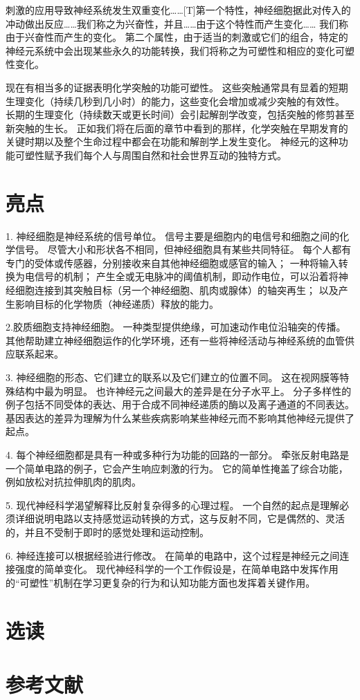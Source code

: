 刺激的应用导致神经系统发生双重变化……[T]第一个特性，神经细胞据此对传入的冲动做出反应……我们称之为兴奋性，并且……由于这个特性而产生变化…… 我们称由于兴奋性而产生的变化。 
第二个属性，由于适当的刺激或它们的组合，特定的神经元系统中会出现某些永久的功能转换，我们将称之为可塑性和相应的变化可塑性变化。


现在有相当多的证据表明化学突触的功能可塑性。 
这些突触通常具有显着的短期生理变化（持续几秒到几小时）的能力，这些变化会增加或减少突触的有效性。 
长期的生理变化（持续数天或更长时间）会引起解剖学改变，包括突触的修剪甚至新突触的生长。 
正如我们将在后面的章节中看到的那样，化学突触在早期发育的关键时期以及整个生命过程中都会在功能和解剖学上发生变化。 
神经元的这种功能可塑性赋予我们每个人与周围自然和社会世界互动的独特方式。



\section{亮点}
1. 神经细胞是神经系统的信号单位。 信号主要是细胞内的电信号和细胞之间的化学信号。 
尽管大小和形状各不相同，但神经细胞具有某些共同特征。 
每个人都有专门的受体或传感器，分别接收来自其他神经细胞或感官的输入； 
一种将输入转换为电信号的机制； 产生全或无电脉冲的阈值机制，即动作电位，可以沿着将神经细胞连接到其突触目标（另一个神经细胞、肌肉或腺体）的轴突再生； 以及产生影响目标的化学物质（神经递质）释放的能力。


2.胶质细胞支持神经细胞。 
一种类型提供绝缘，可加速动作电位沿轴突的传播。 
其他帮助建立神经细胞运作的化学环境，还有一些将神经活动与神经系统的血管供应联系起来。


3. 神经细胞的形态、它们建立的联系以及它们建立的位置不同。 
这在视网膜等特殊结构中最为明显。 
也许神经元之间最大的差异是在分子水平上。 
分子多样性的例子包括不同受体的表达、用于合成不同神经递质的酶以及离子通道的不同表达。 
基因表达的差异为理解为什么某些疾病影响某些神经元而不影响其他神经元提供了起点。


4. 每个神经细胞都是具有一种或多种行为功能的回路的一部分。 
牵张反射电路是一个简单电路的例子，它会产生响应刺激的行为。 
它的简单性掩盖了综合功能，例如放松对抗拉伸肌肉的肌肉。


5. 现代神经科学渴望解释比反射复杂得多的心理过程。 
一个自然的起点是理解必须详细说明电路以支持感觉运动转换的方式，这与反射不同，它是偶然的、灵活的，并且不受制于即时的感觉处理和运动控制。


6. 神经连接可以根据经验进行修改。 
在简单的电路中，这个过程是神经元之间连接强度的简单变化。 
现代神经科学的一个工作假设是，在简单电路中发挥作用的“可塑性”机制在学习更复杂的行为和认知功能方面也发挥着关键作用。


\section{选读}

\section{参考文献}












